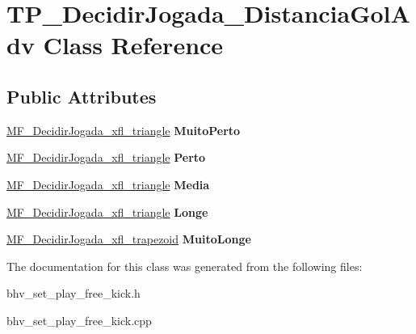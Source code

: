 \hypertarget{classTP__DecidirJogada__DistanciaGolAdv}{
\section{TP\_\-DecidirJogada\_\-DistanciaGolAdv Class Reference}
\label{classTP__DecidirJogada__DistanciaGolAdv}
}
\subsection*{Public Attributes}
\begin{DoxyCompactItemize}
\item 
\hypertarget{classTP__DecidirJogada__DistanciaGolAdv_aa7e225f645fccb651299055ce50e0ff9}{
\hyperlink{classMF__DecidirJogada__xfl__triangle}{MF\_\-DecidirJogada\_\-xfl\_\-triangle} {\bfseries MuitoPerto}}
\label{classTP__DecidirJogada__DistanciaGolAdv_aa7e225f645fccb651299055ce50e0ff9}

\item 
\hypertarget{classTP__DecidirJogada__DistanciaGolAdv_ac626fc2f7629d032164b4450b2b40385}{
\hyperlink{classMF__DecidirJogada__xfl__triangle}{MF\_\-DecidirJogada\_\-xfl\_\-triangle} {\bfseries Perto}}
\label{classTP__DecidirJogada__DistanciaGolAdv_ac626fc2f7629d032164b4450b2b40385}

\item 
\hypertarget{classTP__DecidirJogada__DistanciaGolAdv_ac4d36d465adc9bb343483599b7a42b3d}{
\hyperlink{classMF__DecidirJogada__xfl__triangle}{MF\_\-DecidirJogada\_\-xfl\_\-triangle} {\bfseries Media}}
\label{classTP__DecidirJogada__DistanciaGolAdv_ac4d36d465adc9bb343483599b7a42b3d}

\item 
\hypertarget{classTP__DecidirJogada__DistanciaGolAdv_a6f3a934914f0917aad44b3d146383a05}{
\hyperlink{classMF__DecidirJogada__xfl__triangle}{MF\_\-DecidirJogada\_\-xfl\_\-triangle} {\bfseries Longe}}
\label{classTP__DecidirJogada__DistanciaGolAdv_a6f3a934914f0917aad44b3d146383a05}

\item 
\hypertarget{classTP__DecidirJogada__DistanciaGolAdv_ab63d21e94d6a3341ca49736e3ecd61c6}{
\hyperlink{classMF__DecidirJogada__xfl__trapezoid}{MF\_\-DecidirJogada\_\-xfl\_\-trapezoid} {\bfseries MuitoLonge}}
\label{classTP__DecidirJogada__DistanciaGolAdv_ab63d21e94d6a3341ca49736e3ecd61c6}

\end{DoxyCompactItemize}


The documentation for this class was generated from the following files:\begin{DoxyCompactItemize}
\item 
bhv\_\-set\_\-play\_\-free\_\-kick.h\item 
bhv\_\-set\_\-play\_\-free\_\-kick.cpp\end{DoxyCompactItemize}

